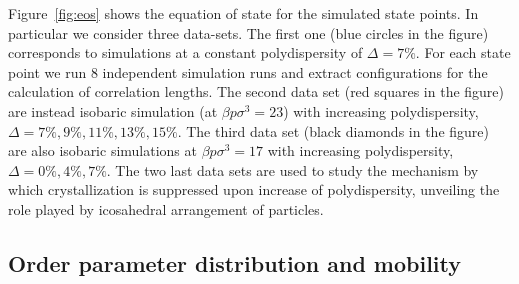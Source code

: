 \documentclass[twocolumn,superscriptaddress]{revtex4}
\begin{document}
Figure~\ref{fig:eos} shows the equation of state for the simulated state points. In particular
we consider three data-sets. The first one (blue circles in the figure) corresponds to
simulations at a constant polydispersity of $\Delta=7\%$. For each state point we run $8$ independent
simulation runs and extract configurations for the calculation of correlation lengths.
The second data set (red squares in the figure) are instead isobaric simulation (at $\beta p\sigma^3=23$)
with increasing polydispersity, $\Delta=7\%,9\%,11\%,13\%,15\%$. The third data set (black diamonds in the figure) are also isobaric simulations at $\beta p\sigma^3=17$ with increasing polydispersity, $\Delta=0\%,4\%,7\%$. The two last data sets are used to study
the mechanism by which crystallization is suppressed upon increase of polydispersity, unveiling the
role played by icosahedral arrangement of particles.

\subsection{Order parameter distribution and mobility}\label{sec:order_parameters}
\end{document}
